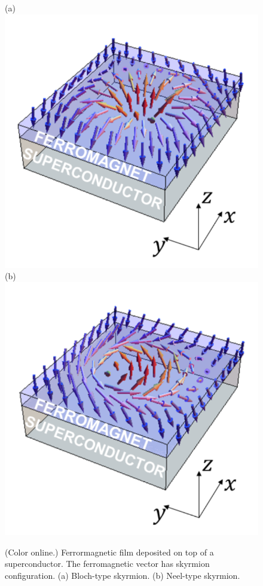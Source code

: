 \documentclass[twocolumn,showpacs,floatfix,nofootinbib,longbibliography]{revtex4-1}
\begin{document}
\begin{figure} \centering
(a) \includegraphics[width=0.4\linewidth]{SkyrmA}  
(b) \includegraphics[width=0.4\linewidth]{SkyrmB} 
\caption{(Color online.) Ferrormagnetic film deposited on top of a superconductor. The ferromagnetic vector has skyrmion configuration. (a) Bloch-type skyrmion.  (b) Neel-type skyrmion. } \label{fig:skyrmion}
\end{figure}

\end{document}
